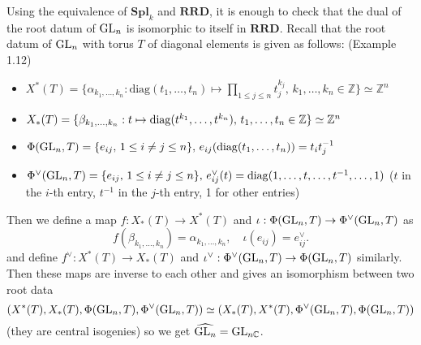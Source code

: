 \begin{problem}
Using the equivalence of $\mathbf{Spl}_{k}$ and $\mathbf{RRD}$, it is enough to check that the dual of the root datum
of $\operatorname{\mathrm{GL}}_{n}$ is isomorphic to itself in $\mathbf{RRD}$.
Recall that the root datum of $\operatorname{\mathrm{GL}}_{n}$ with torus $T$ of diagonal elements is given as follows: (Example 1.12)
\begin{itemize}
    \item $X^{*}(T) = \{
        \alpha_{k_1, \dots, k_{n}}: \mathrm{diag}(t_{1}, \dots, t_{n}) \mapsto \prod_{1\leq j \leq n}t_{j}^{k_{j}}, \, k_{1}, \dots, k_{n} \in \mathbb{Z}
    \}\simeq \mathbb{Z}^{n}$
    \item $X_{*}(T) = \{\beta_{k_{1}, \dots, k_{n}}:t \mapsto \operatorname{\mathrm{diag}}(t^{k_{1}}, \dots, t^{k_{n}}),\, t_{1}, \dots, t_{n} \in \mathbb{Z}\} \simeq \mathbb{Z}^{n}$
    \item $\Phi(\operatorname{\mathrm{GL}}_{n}, T) = \{e_{ij},\,1\leq i\neq j \leq n\},\,e_{ij}(\operatorname{\mathrm{diag}}(t_{1}, \dots, t_{n})) = t_{i}t_{j}^{-1}$
    \item $\Phi^{\vee}(\operatorname{\mathrm{GL}}_{n}, T) = \{e_{ij},\,1\leq i\neq j \leq n\},\,e_{ij}^{\vee}(t) = \operatorname{\mathrm{diag}}(1, \dots, t, \dots, t^{-1}, \dots, 1)$ ($t$ in the $i$-th entry, $t^{-1}$ in the $j$-th entry, 1 for other entries)
\end{itemize}
Then we define a map $f: X_{*}(T) \to X^{*}(T)$ and $\iota: \Phi(\operatorname{\mathrm{GL}}_{n}, T) \to \Phi^{\vee}(\operatorname{\mathrm{GL}}_{n}, T)$ as
$$
    f(\beta_{k_1, \dots, k_n}) = \alpha_{k_1, \dots, k_n}, \quad \iota(e_{ij}) = e_{ij}^{\vee}.
$$
and define $f^{\vee}: X^{*}(T) \to X_{*}(T)$ and $\iota^{\vee}: \Phi^{\vee}(\operatorname{\mathrm{GL}}_{n}, T) \to \Phi(\operatorname{\mathrm{GL}}_{n}, T)$ similarly.
Then these maps are inverse to each other and gives an isomorphism between two root data
$$
    (X^{*}(T), X_{*}(T), \Phi(\operatorname{\mathrm{GL}}_{n}, T), \Phi^{\vee}(\operatorname{\mathrm{GL}}_{n}, T)) \simeq (X_{*}(T), X^{*}(T), \Phi^{\vee}(\operatorname{\mathrm{GL}}_{n}, T), \Phi(\operatorname{\mathrm{GL}}_{n}, T))
$$
(they are central isogenies) so we get $\widehat{\operatorname{\mathrm{GL}}_{n}} = \operatorname{\mathrm{GL}}_{n\mathbb{C}}$.
\end{problem}

